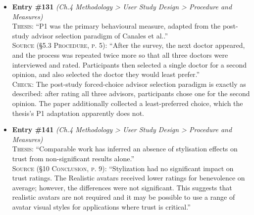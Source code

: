 \documentclass[11pt, a4paper]{article}
\begin{document}
\begin{itemize}[leftmargin=1.2em,itemsep=4pt]
\textsc{Thesis:} ``Canales et al. crossed avatar stylisation level with speaker identity in their study and each of the three advisors was a different person delivering different dialogue.''\\
\textsc{Source (§5.1 Design, p. 5; §1 Introduction, p. 1; §3.2 Dialogue Testing, p. 3):} ``the full experiment uses a 3 (avatar identity) x 3 (avatar style) experimental design, but each participant sees only three avatars, featuring one of each identity and each style ... [§1, p. 1] Each doctor is a different person (varied identity) and each is represented at a different level of stylization ... [§3.2, p. 3] the avatar's voice must match the avatar, which means that a different actor must perform each avatar's dialogue. During the scenario, each avatar must also provide different answers to ensure believability.''\\
\textsc{Check:} The crossed 3x3 identity by style design, the three distinct source persons/actors, and the distinct dialogue per advisor are all stated explicitly. The paper notes the dialogues were pretested to be statistically equivalent on ability, benevolence and integrity, so 'different dialogue' means different text, not different trust content.
\item \textbf{Entry \#131} \textit{(Ch.4 Methodology > User Study Design > Procedure and Measures)}\\
\textsc{Thesis:} ``P1 was the primary behavioural measure, adapted from the post-study advisor selection paradigm of Canales et al..''\\
\textsc{Source (§5.3 Procedure, p. 5):} ``After the survey, the next doctor appeared, and the process was repeated twice more so that all three doctors were interviewed and rated. Participants then selected a single doctor for a second opinion, and also selected the doctor they would least prefer.''\\
\textsc{Check:} The post-study forced-choice advisor selection paradigm is exactly as described: after rating all three advisors, participants chose one for the second opinion. The paper additionally collected a least-preferred choice, which the thesis's P1 adaptation apparently does not.
\item \textbf{Entry \#141} \textit{(Ch.4 Methodology > User Study Design > Procedure and Measures)}\\
\textsc{Thesis:} ``Comparable work has inferred an absence of stylisation effects on trust from non-significant results alone.''\\
\textsc{Source (§10 Conclusion, p. 9):} ``Stylization had no significant impact on trust ratings. The Realistic avatars received lower ratings for benevolence on average; however, the differences were not significant. This suggests that realistic avatars are not required and it may be possible to use a range of avatar visual styles for applications where trust is critical.''\\

\end{itemize}
\end{document}
